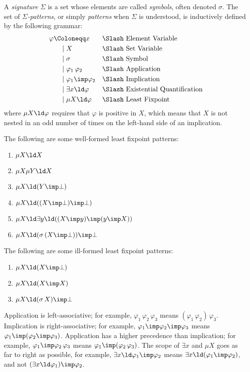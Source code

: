 \documentclass{article}
\begin{document}
\begin{definition}
\label{def:ml_patterns}
A \emph{signature} $\Sigma$ is a set whose elements are called
\emph{symbols}, often denoted $\sigma$.
The set of \emph{$\Sigma$-patterns},
or simply \emph{patterns} when $\Sigma$ is understood,
is inductively defined by the following grammar:
\begin{align*}
\varphi
&\Coloneqq x
  && \text{\Slash Element Variable}
\\&\ \ \ \mid X
  && \text{\Slash Set Variable}
\\&\ \ \ \mid \sigma
  && \text{\Slash Symbol}
\\&\ \ \ \mid \varphi_1 \, \varphi_2
  && \text{\Slash Application}
\\&\ \ \ \mid \varphi_1 \imp \varphi_2
  && \text{\Slash Implication}
\\&\ \ \ \mid \exists x \ld \varphi
  && \text{\Slash Existential Quantification}
\\&\ \ \ \mid \mu X \ld \varphi
  && \text{\Slash Least Fixpoint}
\end{align*}
where $\mu X \ld \varphi$ requires that $\varphi$ is positive in $X$,
which means that $X$ is not nested in an odd number
of times on the left-hand side of an implication.
\end{definition}

The following are some well-formed least fixpoint patterns:
\begin{enumerate}
\item $\mu X \ld X$
\item $\mu X \mu Y \ld X$
\item $\mu X \ld (Y \imp \bot)$
\item $\mu X \ld ((X \imp \bot) \imp \bot)$
\item $\mu X \ld \exists y \ld ((X \imp y) \imp (y \imp X))$
\item $\mu X \ld (\sigma \, (X \imp \bot)) \imp \bot$
\end{enumerate}
The following are some ill-formed least fixpoint patterns:
\begin{enumerate}
\item $\mu X \ld (X \imp \bot)$
\item $\mu X \ld (X \imp X)$
\item $\mu X \ld (\sigma \, X) \imp \bot$
\end{enumerate}

Application is left-associative;
for example, $\varphi_1 \, \varphi_2 \, \varphi_3$ means
$(\varphi_1 \, \varphi_2) \, \varphi_3$.
Implication is right-associative;
for example, $\varphi_1 \imp \varphi_2 \imp \varphi_3$ means
$\varphi_1 \imp (\varphi_2 \imp \varphi_3)$.
Application has a higher precedence than implication;
for example, $\varphi_1 \imp \varphi_2 \, \varphi_3$ means
$\varphi_1 \imp (\varphi_2 \, \varphi_3)$.
The scope of $\exists x$ and $\mu X$ goes as far to right as possible,
for example, $\exists x \ld \varphi_1 \imp \varphi_2$ means
$\exists x \ld (\varphi_1 \imp \varphi_2)$,
and not $(\exists x \ld \varphi_1) \imp \varphi_2$.
\end{document}
